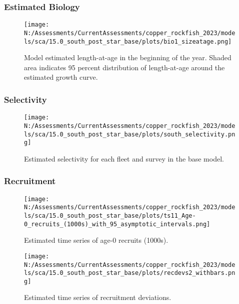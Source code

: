 \documentclass[11pt,
  english,
  letterpaper,
]{article}
\begin{document}
\hypertarget{estimated-biology}{%
\subsubsection{Estimated Biology}\label{estimated-biology}}

\begin{figure}
\centering
\texttt{[image: N:/Assessments/CurrentAssessments/copper\_rockfish\_2023/models/sca/15.0\_south\_post\_star\_base/plots/bio1\_sizeatage.png]}
\caption{Model estimated length-at-age in the beginning of the year. Shaded area indicates 95 percent distribution of length-at-age around the estimated growth curve.\label{fig:mod-est-len-age}}
\end{figure}

\pagebreak

\hypertarget{selectivity}{%
\subsubsection{Selectivity}\label{selectivity}}

\begin{figure}
\centering
\texttt{[image: N:/Assessments/CurrentAssessments/copper\_rockfish\_2023/models/sca/15.0\_south\_post\_star\_base/plots/south\_selectivity.png]}
\caption{Estimated selectivity for each fleet and survey in the base model.\label{fig:est-selex}}
\end{figure}

\newpage

\hypertarget{recruitment-1}{%
\subsubsection{Recruitment}\label{recruitment-1}}

\begin{figure}
\centering
\texttt{[image: N:/Assessments/CurrentAssessments/copper\_rockfish\_2023/models/sca/15.0\_south\_post\_star\_base/plots/ts11\_Age-0\_recruits\_(1000s)\_with\_95\_asymptotic\_intervals.png]}
\caption{Estimated time series of age-0 recruits (1000s).\label{fig:recruits}}
\end{figure}

\pagebreak

\begin{figure}
\centering
\texttt{[image: N:/Assessments/CurrentAssessments/copper\_rockfish\_2023/models/sca/15.0\_south\_post\_star\_base/plots/recdevs2\_withbars.png]}
\caption{Estimated time series of recruitment deviations.\label{fig:rec-devs}}
\end{figure}
\end{document}
